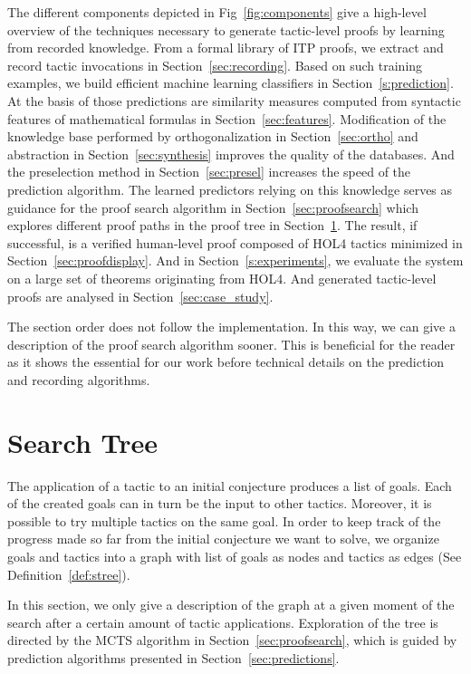 \documentclass[runningheads,a4paper,draft]{svjour3}
\def\holfour{\textsf{HOL4}\xspace}
\begin{document}
The different components depicted in Fig~\ref{fig:components} give a 
high-level overview of the techniques necessary to generate 
tactic-level proofs by learning from recorded knowledge. From a formal library 
of ITP proofs, we extract and record tactic invocations 
in Section~\ref{sec:recording}. Based on such training examples, we
  build efficient machine learning classifiers in Section~\ref{s:prediction}. 
  At the basis of those predictions are 
  similarity measures computed from syntactic features of mathematical formulas 
  in Section~\ref{sec:features}.
  Modification of the knowledge base performed by orthogonalization 
  in Section~\ref{sec:ortho} and abstraction in Section~\ref{sec:synthesis}
  improves the quality of the databases.
  And the preselection method in Section~\ref{sec:presel} increases the speed 
  of the prediction algorithm.
  The learned predictors relying on this knowledge serves as
  guidance for the proof search algorithm in Section~\ref{sec:proofsearch} 
  which explores different proof paths in the proof tree in 
  Section~\ref{sec:prelim}. 
  The result, if
  successful, is a verified human-level proof composed of \holfour
  tactics minimized in Section~\ref{sec:proofdisplay}. And in 
  Section~\ref{s:experiments}, we evaluate the system 
  on a large set of theorems originating from \holfour.
  And generated tactic-level proofs are analysed in 
  Section~\ref{sec:case_study}.

The section order does not follow the implementation. In this way, 
we can give a description of the proof search algorithm sooner. This is 
beneficial for the reader as it shows the essential for our work before 
technical details on the prediction and recording algorithms. 



\section{Search Tree}\label{sec:prelim}
The application of a tactic to an initial conjecture produces a list of goals.
Each of the created goals can in turn be the input to other tactics.
Moreover, it is possible to try multiple tactics on the same goal.
In order to keep track of the progress made so far from the initial conjecture
we want to solve, we organize goals and tactics into a graph with list of goals
as nodes and tactics as edges (See Definition~\ref{def:stree}).

In this section, we only give a description of the graph at a given
moment of the search after a certain amount of tactic applications.
Exploration of the tree is directed by the MCTS algorithm in
Section~\ref{sec:proofsearch}, which is guided by prediction algorithms
presented in Section~\ref{sec:predictions}.
\end{document}

